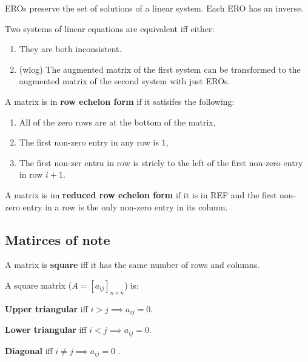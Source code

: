 \documentclass[../Year1/Year1.tex]{subfiles}
\begin{document}
\begin{remark}
    EROs preserve the set of solutions of a linear system. Each ERO has an inverse.
\end{remark}

\begin{definition}
    Two systems of linear equations are equivalent iff either:
    \begin{enumerate}
        \item They are both inconsistent.
        \item (wlog) The augmented matrix of the first system can be transformed to the augmented matrix of the second system with just EROs.
    \end{enumerate}
\end{definition}

\begin{definition}
    A matrix is in \textbf{row echelon form} if it satisifes the following: \begin{enumerate}
        \item All of the zero rows are at the bottom of the matrix,
        \item The first non-zero entry in any row is $1$,
        \item The first non-zer entru in row is stricly to the left of the first non-zero entry in row $i+1$.
    \end{enumerate}
\end{definition}

\begin{definition}
    A matrix is im \textbf{reduced row echelon form} if it is in REF and the first non-zero entry in a row is the only non-zero entry in its column.
\end{definition}

\subsection{Matirces of note}

\begin{definition}
    A matrix is \textbf{square} iff it has the same number of rows and columns.
\end{definition}

\begin{definition}
    A square matrix ($A = [a_{ij}]_{n\times n}$) is: \begin{enumerate*}
        \item \textbf{Upper triangular} iff $i>j \implies a_{ij}=0$.
        \item \textbf{Lower triangular} iff $i<j \implies a_{ij}=0$.
        \item \textbf{Diagonal} iff $i\neq j \implies a_{ij}=0$ .
    \end{enumerate*}
\end{definition}
\end{document}
